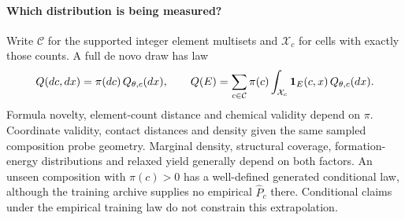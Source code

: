 \paragraph{Which distribution is being measured?}
Write $\mathcal C$ for the supported integer element multisets and $\mathcal X_c$ for cells with exactly those counts. A full de novo draw has law
\[
  Q(dc,dx)=\pi(dc)\,Q_{\theta,c}(dx),\qquad
  Q(E)=\sum_{c\in\mathcal C}\pi(c)\int_{\mathcal X_c}{\bf1}_{E}(c,x)\,Q_{\theta,c}(dx).
\]
Formula novelty, element-count distance and chemical validity depend on $\pi$. Coordinate validity, contact distances and density given the same sampled composition probe geometry. Marginal density, structural coverage, formation-energy distributions and relaxed yield generally depend on both factors. An unseen composition with $\pi(c)>0$ has a well-defined generated conditional law, although the training archive supplies no empirical $\widehat P_c$ there. Conditional claims under the empirical training law do not constrain this extrapolation.
